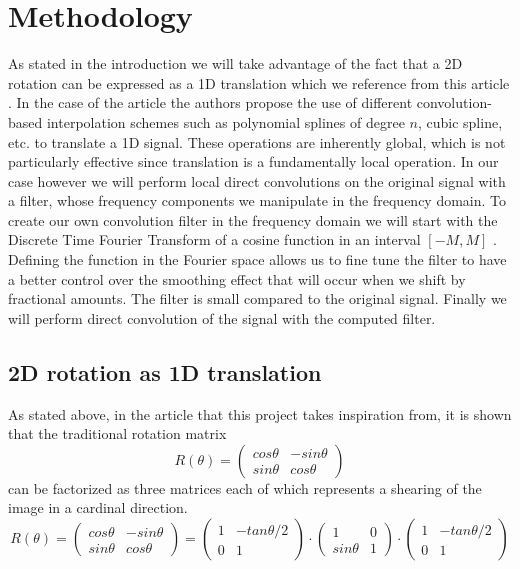 \documentclass[]{usiinfbachelorproject}
\begin{document}
	\section{Methodology}	
		As stated in the introduction we will take advantage of the fact that a 2D rotation can be expressed as a 1D translation which we reference from this article \cite{main_article}. 
		In the case of the article the authors propose the use of different convolution-based interpolation schemes such as polynomial splines of degree $n$, cubic spline, etc. to translate a 1D signal. These operations are inherently global, which is not particularly effective since translation is a fundamentally local operation.
		In our case however we will perform local direct convolutions on the original signal with a filter, whose frequency components we manipulate in the frequency domain.
		 To create our own convolution filter in the frequency domain we will start with the Discrete Time Fourier Transform of a cosine function in an interval $[-M,M]$ . Defining the function in the Fourier space allows us to fine tune the filter to have a better control over the smoothing effect that will occur when we shift by fractional amounts. The filter is small compared to the original signal. Finally we will perform direct convolution of the signal with the computed filter.
		 
		 \subsection{2D rotation as 1D translation}
		 As stated above, in the article that this project takes inspiration from, it is shown that the traditional rotation matrix
	\begin{equation*}
		R(\theta) = 
		\begin{pmatrix}
			cos\theta & -sin\theta\\
			sin\theta & cos\theta
		\end{pmatrix}
	\end{equation*}
	can be factorized as three matrices each of which represents a shearing of the image in a cardinal direction.
	\begin{equation}\label{3_translations}
		R(\theta) = 
		\begin{pmatrix}
			cos\theta & -sin\theta\\
			sin\theta & cos\theta
		\end{pmatrix}
		=
		\begin{pmatrix}
			1 & -tan\theta/2\\
			0 & 1
		\end{pmatrix}
		\cdot
		\begin{pmatrix}
			1 & 0\\
			sin\theta & 1
		\end{pmatrix}
		\cdot
		\begin{pmatrix}
			1 & -tan\theta/2\\
			0 & 1
		\end{pmatrix}
	\end{equation} 
	
\end{document}
